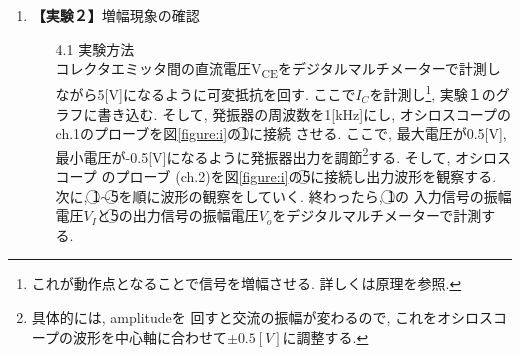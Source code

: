 \documentclass[uplatex,a4paper,11pt,dvipdfmxs]{jsarticle}
\begin{document}
\begin{enumerate}
    \item {\bf \large 【実験２】}{\large 増幅現象の確認}\\
    \begin{enumerate}
        \item[4.1] 実験方法\\
        コレクタエミッタ間の直流電圧V\textsubscript{CE}をデジタルマルチメーターで計測しながら5[V]になるように可変抵抗を回す. 
        ここで\(I_C\)を計測し\footnote{これが動作点となることで信号を増幅させる. 詳しくは原理を参照.}, 実験１のグラフに書き込む. 
        そして, 発振器の周波数を1[kHz]にし, オシロスコープのch.1のプローブを図\ref{figure:i}の\textcircled{\scriptsize 1}に接続
        させる. ここで, 最大電圧が0.5[V], 最小電圧が-0.5[V]になるように発振器出力を調節\footnote{具体的には, amplitudeを
        回すと交流の振幅が変わるので, これをオシロスコープの波形を中心軸に合わせて\(\pm0.5[V]\)に調整する.}する. そして, オシロスコープ
        のプローブ (ch.2)を図\ref{figure:i}の\textcircled{\scriptsize 5}に接続し出力波形を観察する. 次に, 
        \textcircled{\scriptsize 1}\(\sim \)\textcircled{\scriptsize 5}を順に波形の観察をしていく. 終わったら, \textcircled{\scriptsize 1}の
        入力信号の振幅電圧\(V_I\)と\textcircled{\scriptsize 5}の出力信号の振幅電圧\(V_o\)をデジタルマルチメーターで計測する. \\


\end{enumerate}
\end{enumerate}
\end{document}

